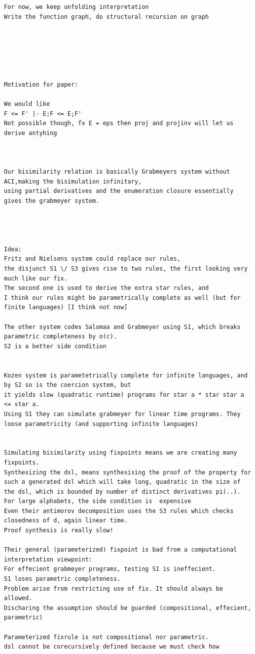\begin{verbatim}
For now, we keep unfolding interpretation
Write the function graph, do structural recursion on graph






Motivation for paper:

We would like 
F <= F' |- E;F <= E;F'
Not possible though, fx E = eps then proj and projinv will let us derive antyhing



Our bisimilarity relation is basically Grabmeyers system without ACI,making the bisimulation infinitary,
using partial derivatives and the enumeration closure essentially gives the grabmeyer system.




Idea:
Fritz and Nielsens system could replace our rules,
the disjunct S1 \/ S3 gives rise to two rules, the first looking very much like our fix.
The second one is used to derive the extra star rules, and 
I think our rules might be parametrically complete as well (but for finite languages) [I think not now]

The other system codes Salomaa and Grabmeyer using S1, which breaks parametric completeness by o(c).
S2 is a better side condition


Kozen system is parametetrically complete for infinite languages, and by S2 so is the coercion system, but 
it yields slow (quadratic runtime) programs for star a * star star a <= star a. 
Using S1 they can simulate grabmeyer for linear time programs. They loose parametricity (and supporting infinite languages) 


Simulating bisimilarity using fixpoints means we are creating many fixpoints.
Synthesizing the dsl, means synthesising the proof of the property for such a generated dsl which will take long, quadratic in the size of the dsl, which is bounded by number of distinct derivatives pi(..).
For large alphabets, the side condition is  expensive
Even their antimorov decomposition uses the S3 rules which checks closedness of d, again linear time.
Proof synthesis is really slow!

Their general (parameterized) fixpoint is bad from a computational interpretation viewpoint:
For effecient grabmeyer programs, testing S1 is ineffecient.
S1 loses parametric completeness. 
Problem arise from restricting use of fix. It should always be allowed. 
Discharing the assumption should be guarded (compositional, effecient, parametric)

Parameterized fixrule is not compositional nor parametric.
dsl cannot be corecursively defined because we must check how 


\end{verbatim}
